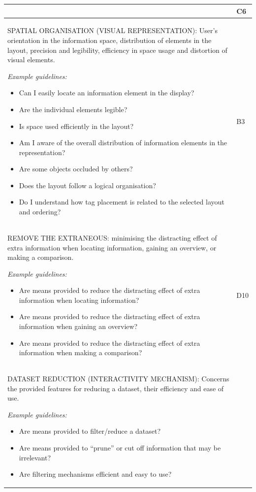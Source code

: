 \begin{longtable}{|p{12cm}|p{1cm}|}
& C6 \\ \hline
SPATIAL ORGANISATION (VISUAL REPRESENTATION): User's orientation in the information space, distribution of elements in the layout, precision and legibility, efficiency in space usage and distortion of visual elements.
\par
\textit{Example guidelines:}
\begin{itemize}
\item Can I easily locate an information element in the display?
\item Are the individual elements legible?
\item Is space used efficiently in the layout?
\item Am I aware of the overall distribution of information elements in the representation?
\item Are some objects occluded by others?
\item Does the layout follow a logical organisation?
\item Do I understand how tag placement is related to the selected layout and ordering? 
\end{itemize}

& B3 \\ \hline
REMOVE THE EXTRANEOUS: minimising the distracting effect of extra information when locating information, gaining an overview, or making a comparison. 
\par
\textit{Example guidelines:}
\begin{itemize}
\item Are means provided to reduce the distracting effect of extra information when locating information?
\item Are means provided to reduce the distracting effect of extra information when gaining an overview?
\item Are means provided to reduce the distracting effect of extra information when   making a comparison?
\end{itemize}

& D10 \\ \hline
DATASET REDUCTION (INTERACTIVITY MECHANISM): Concerns the provided features for reducing a dataset, their efficiency and ease of use.
\par
\textit{Example guidelines:}
\begin{itemize}
\item Are means provided to filter/reduce a dataset?
\item Are means provided to “prune” or cut off information that may be irrelevant?
\item Are filtering mechanisms efficient and easy to use?
\end{itemize}


\end{longtable}
